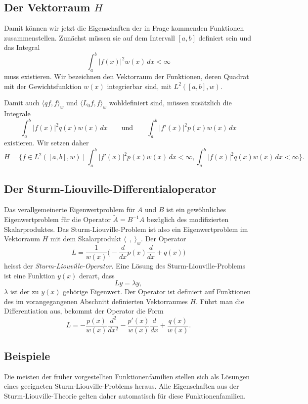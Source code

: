 %
%
\subsection{Der Vektorraum $H$}
Damit können wir jetzt die Eigenschaften der in Frage kommenden
Funktionen zusammenstellen.
Zunächst müssen sie auf dem Intervall $[a,b]$ definiert sein und
das Integral
\[
\int_a^b |f(x)|^2 w(x)\,dx < \infty
\]
muss existieren.
Wir bezeichnen den Vektorraum der Funktionen, deren Quadrat mit
der Gewichtsfunktion $w(x)$ integrierbar sind, mit
$L^2([a,b],w)$.

Damit auch $\langle qf,f\rangle_w$ und $\langle L_0f,f\rangle_w$
wohldefiniert sind, müssen zusätzlich die Integrale
\[
\int_a^b |f(x)|^2 q(x) w(x)\,dx
\qquad\text{und}\qquad
\int_a^b |f'(x)|^2 p(x) w(x)\,dx
\]
existieren.
Wir setzen daher
\[
H
=
\biggl\{
f\in L^2([a,b],w)\;\bigg|\;
\int_a^b |f'(x)|^2p(x)w(x)\,dx<\infty,
\int_a^b |f(x)|^2q(x)w(x)\,dx<\infty
\biggr\}.
\]

%
%
\subsection{Der Sturm-Liouville-Differentialoperator}
Das verallgemeinerte Eigenwertproblem für $A$ und $B$ ist ein
gewöhnliches Eigenwertproblem für die Operator $\tilde{A}=B^{-1}A$
bezüglich des modifizierten Skalarproduktes.
Das Sturm-Liouville-Problem ist also ein Eigenwertproblem im
Vektorraum $H$ mit dem Skalarprodukt $\langle\,\;,\;\rangle_w$.
Der Operator
\begin{equation}
L = \frac{1}{w(x)} \biggl(-\frac{d}{dx} p(x)\frac{d}{dx} + q(x)\biggr)
\label{buch:orthogonal:sturm-liouville:opL1}
\end{equation}
heisst der {\em Sturm-Liouville-Operator}.
Eine Lösung des Sturm-Liouville-Problems ist eine Funktion $y(x)$ derart,
dass 
\[
Ly = \lambda y,
\]
$\lambda$ ist der zu $y(x)$ gehörige Eigenwert.
Der Operator ist definiert auf Funktionen des im vorangegangenen Abschnitt
definierten Vektorraumes $H$.
Führt man die Differentiation aus, bekommt der Operator die Form
\begin{equation}
L
=
-\frac{p(x)}{w(x)} \frac{d^2}{dx^2}
-\frac{p'(x)}{w(x)} \frac{d}{dx}
+\frac{q(x)}{w(x)}.
\label{buch:orthogonal:sturm-liouville:opL2}
\end{equation}

%
%
\subsection{Beispiele}
Die meisten der früher vorgestellten Funktionenfamilien stellen sich
als Lösungen eines geeigneten Sturm-Liouville-Problems heraus.
Alle Eigenschaften aus der Sturm-Liouville-Theorie gelten daher
automatisch für diese Funktionenfamilien.


